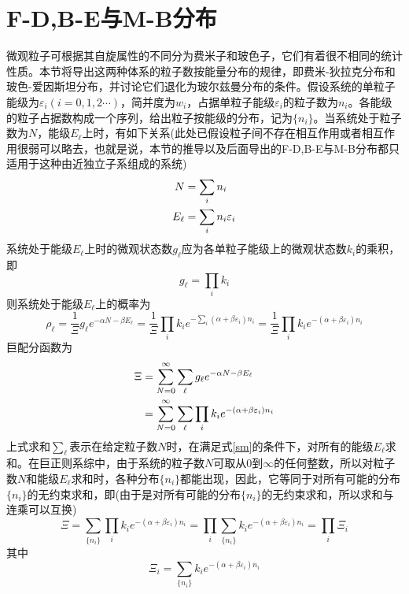 \documentclass[UTF8,oneside,openany]{ctexbook}
\begin{document}
\section{F-D,B-E与M-B分布}
微观粒子可根据其自旋属性的不同分为费米子和玻色子，它们有着很不相同的统计性质。本节将导出这两种体系的粒子数按能量分布的规律，即费米-狄拉克分布和玻色-爱因斯坦分布，并讨论它们退化为玻尔兹曼分布的条件。假设系统的单粒子能级为$\varepsilon_i(i=0,1,2\cdots)$，简并度为$w_i$，占据单粒子能级$\varepsilon_i$的粒子数为$n_i$。各能级的粒子占据数构成一个序列，给出粒子按能级的分布，记为$\{n_i\}$。当系统处于粒子数为$N$，能级$E_{\ell}$上时，有如下关系(此处已假设粒子间不存在相互作用或者相互作用很弱可以略去，也就是说，本节的推导以及后面导出的F-D,B-E与M-B分布都只适用于这种由近独立子系组成的系统)
\begin{align}\label{sm}
N&=\sum_{i}n_i\notag\\
E_{\ell}&=\sum_{i}n_i\varepsilon_i
\end{align}
系统处于能级$E_{\ell}$上时的微观状态数$g_{\ell}$应为各单粒子能级上的微观状态数$k_i$的乘积，即
\begin{equation}
g_{\ell}=\prod_{i}k_i
\end{equation}
则系统处于能级$E_{\ell}$上的概率为
\begin{equation}
\rho_{\ell}=\frac{1}{\Xi}g_{\ell}e^{-\alpha N-\beta E_{\ell}}=\frac{1}{\Xi}\prod_{i}k_ie^{-\sum_{i}(\alpha+\beta\varepsilon_i)n_i}=\frac{1}{\Xi}\prod_{i}k_ie^{-(\alpha+\beta\varepsilon_i)n_i}
\end{equation}
巨配分函数为
\begin{align}
\Xi&=\sum_{N=0}^{\infty}\sum_{\ell}g_{\ell}e^{-\alpha N-\beta E_{\ell}}\notag\\
&=\sum_{N=0}^{\infty}\sum_{\ell}\prod_{i}k_ie^{-(\alpha+\beta\varepsilon_i)n_i}
\end{align}
上式求和$\sum_{\ell}$表示在给定粒子数$N$时，在满足式\ref{sm}的条件下，对所有的能级$E_{\ell}$求和。在巨正则系综中，由于系统的粒子数$N$可取从0到$\infty$的任何整数，所以对粒子数$N$和能级$E_{\ell}$求和时，各种分布$\{n_i\}$都能出现，因此，它等同于对所有可能的分布$\{n_i\}$的无约束求和，即(由于是对所有可能的分布$\{n_i\}$的无约束求和，所以求和与连乘可以互换)
\begin{equation}
\Xi=\sum_{\{n_i\}}\prod_{i}k_ie^{-(\alpha+\beta\varepsilon_i)n_i}=\prod_{i}\sum_{\{n_i\}}k_ie^{-(\alpha+\beta\varepsilon_i)n_i}=\prod_{i}\Xi_i
\end{equation}
其中
\begin{equation}\label{Xii}
\Xi_i=\sum_{\{n_i\}}k_ie^{-(\alpha+\beta\varepsilon_i)n_i}
\end{equation}
\end{document}
